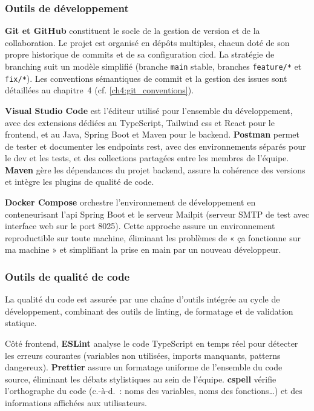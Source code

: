 \subsubsection{Outils de développement}
\label{ch2:outils_dev}

\textbf{Git et GitHub} constituent le socle de la gestion de version et de la collaboration. Le projet est organisé en dépôts multiples, chacun doté de son propre historique de commits et de sa configuration \gls{cicd}. La stratégie de branching suit un modèle simplifié (branche \texttt{main} stable, branches \texttt{feature/*} et \texttt{fix/*}). Les conventions sémantiques de commit et la gestion des issues sont détaillées au chapitre~4 (cf. \cref{ch4:git_conventions}).

\textbf{Visual Studio Code} est l'éditeur utilisé pour l'ensemble du développement, avec des extensions dédiées au TypeScript, Tailwind \acrshort{css} et React pour le frontend, et au Java, Spring Boot et Maven pour le backend. \textbf{Postman} permet de tester et documenter les endpoints \gls{rest}, avec des environnements séparés pour le dev et les tests, et des collections partagées entre les membres de l'équipe. \textbf{Maven} gère les dépendances du projet backend, assure la cohérence des versions et intègre les plugins de qualité de code.

\textbf{Docker Compose} orchestre l'environnement de développement en conteneurisant l'\acrshort{api} Spring Boot et le serveur Mailpit (serveur SMTP de test avec interface web sur le port 8025). Cette approche assure un environnement reproductible sur toute machine, éliminant les problèmes de « ça fonctionne sur ma machine » et simplifiant la prise en main par un nouveau développeur.

\subsubsection{Outils de qualité de code}
\label{ch2:qualite_code}

La qualité du code est assurée par une chaîne d'outils intégrée au cycle de développement, combinant des outils de linting, de formatage et de validation statique.

Côté frontend, \textbf{ESLint} analyse le code TypeScript en temps réel pour détecter les erreurs courantes (variables non utilisées, imports manquants, patterns dangereux). \textbf{Prettier} assure un formatage uniforme de l'ensemble du code source, éliminant les débats stylistiques au sein de l'équipe. \textbf{cspell} vérifie l'orthographe du code (c.-à-d.\ : noms des variables, noms des fonctions\dots) et des informations affichées aux utilisateurs.


